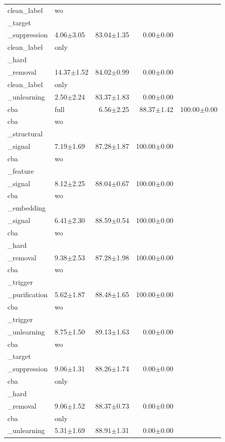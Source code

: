 \begin{table}[t]
\begin{tabular}{llrrr}
clean_label & wo\\_target\\_suppression & 4.06$\pm$3.05 & 83.04$\pm$1.35 & 0.00$\pm$0.00 \\
clean_label & only\\_hard\\_removal & 14.37$\pm$1.52 & 84.02$\pm$0.99 & 0.00$\pm$0.00 \\
clean_label & only\\_unlearning & 2.50$\pm$2.24 & 83.37$\pm$1.83 & 0.00$\pm$0.00 \\
cba & full & 6.56$\pm$2.25 & 88.37$\pm$1.42 & 100.00$\pm$0.00 \\
cba & wo\\_structural\\_signal & 7.19$\pm$1.69 & 87.28$\pm$1.87 & 100.00$\pm$0.00 \\
cba & wo\\_feature\\_signal & 8.12$\pm$2.25 & 88.04$\pm$0.67 & 100.00$\pm$0.00 \\
cba & wo\\_embedding\\_signal & 6.41$\pm$2.30 & 88.59$\pm$0.54 & 100.00$\pm$0.00 \\
cba & wo\\_hard\\_removal & 9.38$\pm$2.53 & 87.28$\pm$1.98 & 100.00$\pm$0.00 \\
cba & wo\\_trigger\\_purification & 5.62$\pm$1.87 & 88.48$\pm$1.65 & 100.00$\pm$0.00 \\
cba & wo\\_trigger\\_unlearning & 8.75$\pm$1.50 & 89.13$\pm$1.63 & 0.00$\pm$0.00 \\
cba & wo\\_target\\_suppression & 9.06$\pm$1.31 & 88.26$\pm$1.74 & 0.00$\pm$0.00 \\
cba & only\\_hard\\_removal & 9.06$\pm$1.52 & 88.37$\pm$0.73 & 0.00$\pm$0.00 \\
cba & only\\_unlearning & 5.31$\pm$1.69 & 88.91$\pm$1.31 & 0.00$\pm$0.00 \\
\bottomrule
\end{tabular}
\end{table}
